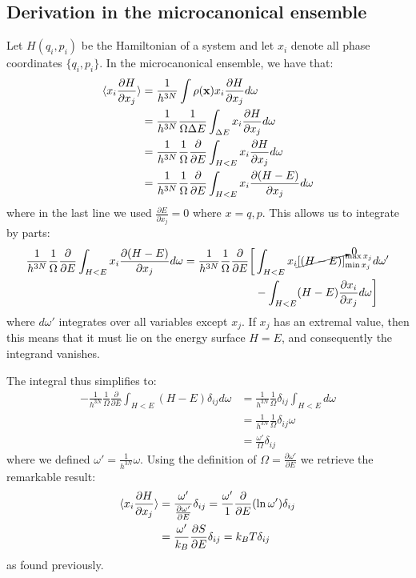 \documentclass[a4paper,11pt,oneside]{book}
\begin{document}
\subsection*{Derivation in the microcanonical ensemble}
Let $H(q_i,p_i)$ be the Hamiltonian of a system and let $x_i$ denote all phase coordinates $\{q_i,p_i\}$. In the microcanonical ensemble, we have that:
\begin{align}
    \braket{x_i \frac{\partial H}{\partial x_j}} &= \frac{1}{h^{3N}} \int \rho(\textbf{x})x_i \frac{\partial H}{\partial x_j}d\omega\\
    &= \frac{1}{h^{3N}}\frac{1}{\Omega \Delta E} \int_{\Delta E}  x_i \frac{\partial H}{\partial x_j} d\omega\\
    &=\frac{1}{h^{3N}} \frac{1}{\Omega} \frac{\partial}{\partial E}\int_{H<E}  x_i \frac{\partial H}{\partial x_j}d\omega\\
    &= \frac{1}{h^{3N}} \frac{1}{\Omega}  \frac{\partial}{\partial E}\int_{H<E} x_i \frac{\partial (H-E)}{\partial x_j}d\omega
\end{align}
where in the last line we used $\frac{\partial E}{\partial x_j}=0$ where $x=q,p$. This allows us to integrate by parts:
\begin{align}
    \frac{1}{h^{3N}} \frac{1}{\Omega} \frac{\partial}{\partial E}\int_{H<E}  x_i \frac{\partial (H-E)}{\partial x_j}d\omega=  \frac{1}{h^{3N}} \frac{1}{\Omega} \frac{\partial}{\partial E}\bigg[&\int_{H<E} x_i\cancelto{0}{[(H-E)]}_{\min{x_j}}^{\max{x_j}} d\omega'\\ \nonumber
    &- \int_{H<E} (H-E)\frac{\partial x_i}{\partial x_j}d\omega\bigg]
\end{align}
where $d\omega'$ integrates over all variables except $x_j$. If $x_j$ has an extremal value, then this means that it must lie on the energy surface $H=E$, and consequently the integrand vanishes. 

The integral thus simplifies to:
\begin{align}
    -\frac{1}{h^{3N}} \frac{1}{\Omega} \frac{\partial}{\partial E}\int_{H<E} (H-E)\delta_{ij}d\omega &=  \frac{1}{h^{3N}} \frac{1}{\Omega}\delta_{ij} \int_{H<E}d\omega\\
    &=\frac{1}{h^{3N}} \frac{1}{\Omega}\delta_{ij} \omega\\
    &=\frac{\omega'}{\Omega}\delta_{ij} 
\end{align}
where we defined $\omega' = \frac{1}{h^{3N}} \omega$. Using the definition of $\Omega = \frac{\partial \omega'}{\partial E}$ we retrieve the remarkable result:
\begin{align}
     \braket{x_i \frac{\partial H}{\partial x_j}} &= \frac{\omega'}{\frac{\partial \omega'}{\partial E}}\delta_{ij}=\frac{\omega'}{1}{\frac{\partial}{\partial E}(\ln \omega')}\delta_{ij}\\
     &=\frac{\omega'}{k_B}{\frac{\partial S}{\partial E}}\delta_{ij}= k_B T \delta_{ij}
\end{align}
as found previously.
\end{document}
